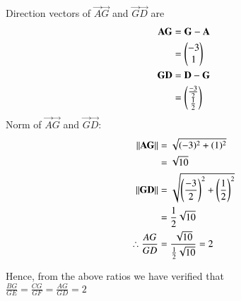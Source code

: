 \documentclass[journal,12pt,onecolumn]{IEEEtran}
\theoremstyle{remark}
\begin{document}
\begin{enumerate}
Direction vectors of $\vec{A}\vec{G}$ and $\vec{G}\vec{D}$ are \\
\begin{align}       
\mathbf{A}\mathbf{G}&=\mathbf{G}-\mathbf{A}\\
              &=\begin{pmatrix}-3\\1\end{pmatrix}\\
\mathbf{G}\mathbf{D}&=\mathbf{D}-\mathbf{G}\\
              &=\begin{pmatrix}\frac{-3}{2}\\\frac{1}{2}\end{pmatrix}
\end{align}
Norm of $\vec{A}\vec{G}$ and $\vec{G}\vec{D}$:\\
\begin{align}
\left\lVert\mathbf{A}\mathbf{G}\right\rVert&=\sqrt{(-3)^2+(1)^2}\\
               &=\sqrt{10}\\
\left\lVert\mathbf{G}\mathbf{D}\right\rVert&=\sqrt{\left(\frac{-3}{2}\right)^2+\left(\frac{1}{2}\right)^2}\\
               &=\frac{1}{2}\sqrt{10}\\
\therefore \frac{AG}{GD}&=\frac{\sqrt{10}}{\frac{1}{2}\sqrt{10}}=2
\end{align}
\end{enumerate}
Hence, from the above ratios we have verified that \\
$\frac{BG}{GE}=\frac{CG}{GF}=\frac{AG}{GD}=2$
\end{document}
